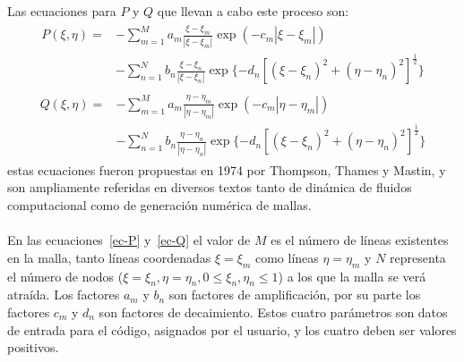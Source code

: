 \documentclass[letterpaper, openright, 12pt]{book}
\begin{document}
    \paragraph*{}
    Las ecuaciones para $P$ y $Q$ que llevan a cabo este proceso son:
    \begin{align}
        \begin{aligned}
            P(\xi, \eta) =& - \sum_{m = 1}^{M} a_{m}
                \frac{\xi - \xi_{m}}{|\xi - \xi_{m}|}
                \exp(-c_{m}|\xi - \xi_{m}|) \\&
            - \sum_{n=1}^{N} b_{n} \frac{\xi - \xi_{n}}{| \xi - \xi_{n} |}
                \exp\lbrace -d_{n} \left[ \left( \xi - \xi_{n} \right)^2
                + \left( \eta - \eta_{n} \right)^2 \right]^\frac{1}{2} \rbrace
        \end{aligned}
        \label{ec-P}
    \end{align}
    \begin{align}
        \begin{aligned}
            Q(\xi, \eta) =& - \sum_{m = 1}^{M} a_{m}
                \frac{\eta - \eta_{m}}{|\eta - \eta_{m}|}
                \exp(-c_{m}|\eta - \eta_{m}|) \\&
            - \sum_{n=1}^{N} b_{n} \frac{\eta - \eta_{n}}{| \eta - \eta_{n} |}
                \exp\lbrace -d_{n} \left[ \left( \xi - \xi_{n} \right)^2
                + \left( \eta - \eta_{n} \right)^2 \right]^\frac{1}{2} \rbrace
        \end{aligned}
        \label{ec-Q}
    \end{align}
    estas ecuaciones fueron propuestas en 1974 por Thompson, Thames y
    Mastin\cite{thompson1974automatic}, y son ampliamente referidas en
    diversos textos tanto de dinámica de fluidos computacional como de
    generación numérica de mallas.

    \paragraph*{}
    En las ecuaciones~\ref{ec-P} y~\ref{ec-Q} el valor de $M$ es el número
    de líneas existentes en la malla, tanto líneas coordenadas
    $\xi = \xi_{m}$ como líneas $\eta = \eta_{m}$ y $N$ representa el número
    de nodos ($\xi = \xi_{n}, \eta = \eta_{n}, 0 \leq \xi_{n}, \eta_{n} \leq 1$)
    a los que la malla se verá atraída. Los factores $a_{m}$ y $b_{n}$ son
    factores de amplificación, por su parte los factores $c_{m}$ y $d_{n}$
    son factores de decaimiento. Estos cuatro parámetros son datos de entrada
    para el código, asignados por el usuario, y los cuatro deben ser valores
    positivos.
\end{document}
